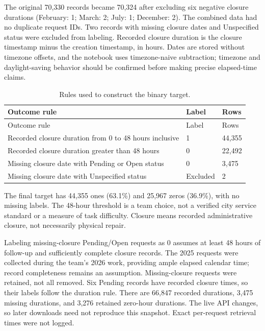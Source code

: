 The original 70,330 records became 70,324 after excluding six negative closure durations (February: 1; March: 2; July: 1; December: 2). The combined data had no duplicate request IDs. Two records with missing closure dates and Unspecified status were excluded from labeling. Recorded closure duration is the closure timestamp minus the creation timestamp, in hours. Dates are stored without timezone offsets, and the notebook uses timezone-naive subtraction; timezone and daylight-saving behavior should be confirmed before making precise elapsed-time claims.
\begin{longtable}{@{}p{.67\linewidth}p{.10\linewidth}p{.16\linewidth}@{}}
\caption{Rules used to construct the binary target.}\\
\toprule Outcome rule & Label & Rows\\\midrule\endfirsthead
\toprule Outcome rule & Label & Rows\\\midrule\endhead
\bottomrule\endfoot
Recorded closure duration from 0 to 48 hours inclusive & 1 & 44,355\\
Recorded closure duration greater than 48 hours & 0 & 22,492\\
Missing closure date with Pending or Open status & 0 & 3,475\\
Missing closure date with Unspecified status & Excluded & 2\\
\end{longtable}
The final target has 44,355 ones (63.1\%) and 25,967 zeros (36.9\%), with no missing labels. The 48-hour threshold is a team choice, not a verified city service standard or a measure of task difficulty. Closure means recorded administrative closure, not necessarily physical repair.

Labeling missing-closure Pending/Open requests as 0 assumes at least 48 hours of follow-up and sufficiently complete closure records. The 2025 requests were collected during the team's 2026 work, providing ample elapsed calendar time; record completeness remains an assumption. Missing-closure requests were retained, not all removed. Six Pending records have recorded closure times, so their labels follow the duration rule. There are 66,847 recorded durations, 3,475 missing durations, and 3,276 retained zero-hour durations. The live API changes, so later downloads need not reproduce this snapshot. Exact per-request retrieval times were not logged.


